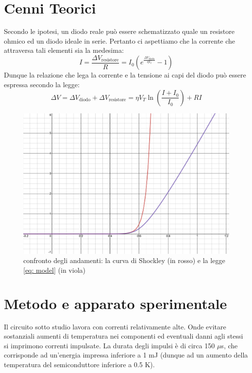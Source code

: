 \documentclass{article}[a4paper, oneside, 11pt]
\begin{document}
\section{Cenni Teorici}
Secondo le ipotesi, un diodo reale può essere schematizzato quale un resistore 
ohmico ed un diodo ideale in serie. Pertanto ci aspettiamo che la corrente che 
attraversa tali elementi sia la medesima:
\begin{equation}
	I = \frac{\Delta V_{\text{resistore}}}{R} =
	I_0 \left( e^{\frac{\Delta V_{\text{diodo}}}{\eta V_t}} - 1\right)
\end{equation}
Dunque la relazione che lega la corrente e la tensione ai capi del diodo può 
essere espressa secondo la legge:
\begin{equation}\label{eq: model}
	\Delta V = \Delta V_{\text{diodo}} + \Delta V_{\text{resistore}} = \eta 
V_T \ln{\left(\frac{
	I+I_0}{I_0}\right)} + RI
\end{equation}
\begin{figure}[H]
	\centering 
 		\includegraphics[scale=0.25]{./confronto_curve.png}
 	\caption{confronto degli andamenti: la curva di Shockley (in rosso) e la 
legge \eqref{eq: model} (in viola)}
\end{figure}


\section{Metodo e apparato sperimentale}
Il circuito sotto studio lavora con correnti relativamente alte. Onde evitare 
sostanziali aumenti di temperatura nei componenti ed eventuali danni agli 
stessi si imprimono correnti impulsate.
La durata degli impulsi è di circa 150 $\mu$s, che 
corrisponde ad un'energia impressa inferiore a 1 mJ (dunque ad un aumento della 
temperatura del semiconduttore inferiore a 0.5 K).
\end{document}
